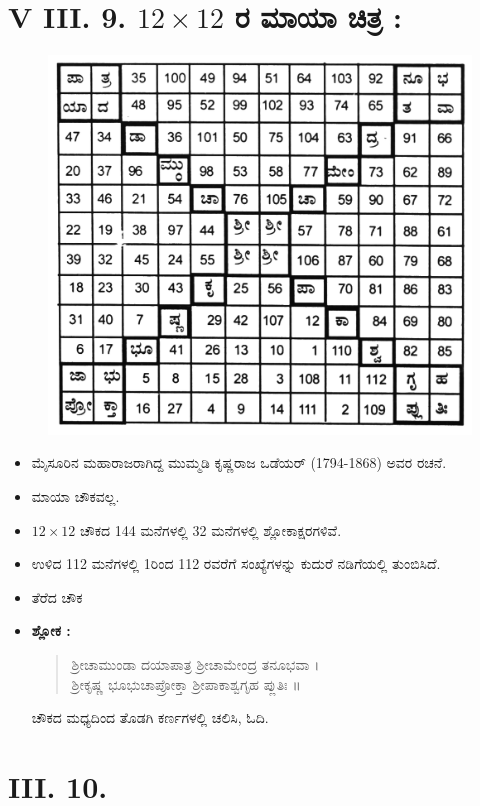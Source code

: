 \section*{V III. 9. $12 \times 12$ ರ ಮಾಯಾ ಚಿತ್ರ :}
\begin{figure}[H]
\includegraphics{src/figures/chap6/fig6.12.jpg}
\end{figure}

\begin{itemize}
	\item ಮೈಸೂರಿನ ಮಹಾರಾಜರಾಗಿದ್ದ ಮುಮ್ಮಡಿ ಕೃಷ್ಣರಾಜ ಒಡೆಯರ್ (1794-1868) ಅವರ ರಚನೆ.
	\item ಮಾಯಾ ಚೌಕವಲ್ಲ.
	\item $12 \times 12$ ಚೌಕದ 144 ಮನೆಗಳಲ್ಲಿ 32 ಮನೆಗಳಲ್ಲಿ ಶ್ಲೋಕಾಕ್ಷರಗಳಿವೆ.
	\item ಉಳಿದ 112 ಮನೆಗಳಲ್ಲಿ 1ರಿಂದ 112 ರವರೆಗೆ ಸಂಖ್ಯೆಗಳನ್ನು ಕುದುರೆ ನಡಿಗೆಯಲ್ಲಿ ತುಂಬಿಸಿದೆ.
	\item ತೆರೆದ ಚೌಕ
	\item \textbf{ಶ್ಲೋಕ :} 
	\begin{quote}
	ಶ್ರೀಚಾಮುಂಡಾ ದಯಾಪಾತ್ರ ಶ್ರೀಚಾಮೇಂದ್ರ ತನೂಭವಾ ।\\
	ಶ್ರೀಕೃಷ್ಣ ಭೂಭುಚಾಪ್ರೋಕ್ತಾ ಶ್ರೀಪಾಕಾಶ್ವಗೃಹ ಪ್ಲುತಿಃ ॥
	\end{quote}
	ಚೌಕದ ಮಧ್ಯದಿಂದ ತೊಡಗಿ ಕರ್ಣಗಳಲ್ಲಿ ಚಲಿಸಿ, ಓದಿ.
\end{itemize}

\section*{ III. 10.}

